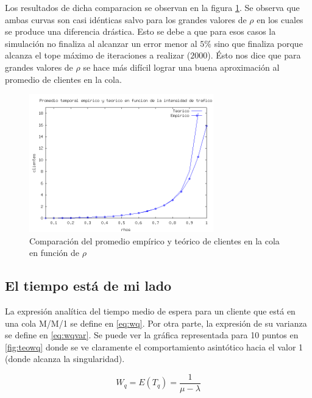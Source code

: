 \documentclass{sig-alternate}
\begin{document}
Los resultados de dicha comparacion se observan en la figura \ref{fig:meanQueueVS}. Se observa que ambas curvas
son casi id\'enticas salvo para los grandes valores de $\rho$ en los cuales se produce una diferencia dr\'astica.
Esto se debe a que para esos casos la simulaci\'on no finaliza al alcanzar un error menor al $5\%$ sino que finaliza
porque alcanza el tope m\'aximo de iteraciones a realizar ($2000$). \'Esto nos dice que para grandes valores de $\rho$
se hace m\'as dif\'icil lograr una buena aproximaci\'on al promedio de clientes en la cola.

\begin{figure}[ht]
\begin{center}
\includegraphics[width=8cm]{teoricoVSempirico}
\caption{\label{fig:meanQueueVS} Comparaci\'on del promedio emp\'irico y te\'orico de clientes en la cola en funci\'on de $\rho$}
\end{center}
\end{figure}

\newpage


\subsection{El tiempo est\'a de mi lado}
\label{sec:parte2}

La expresi\'on anal\'itica del tiempo medio de espera para un cliente que est\'a en una cola M/M/1 se define en \eqref{eq:wq}.
Por otra parte, la expresi\'on de su varianza se define en \eqref{eq:wqvar}.
Se puede ver la gr\'afica representada para 10 puntos en \ref{fig:teowq} donde
se ve claramente el comportamiento asint\'otico hacia el valor 1 (donde alcanza la singularidad).

\begin{equation}
\label{eq:wq}
  W_q = E (T_q)= \frac{1}{\mu-\lambda}
\end{equation}
\end{document}
